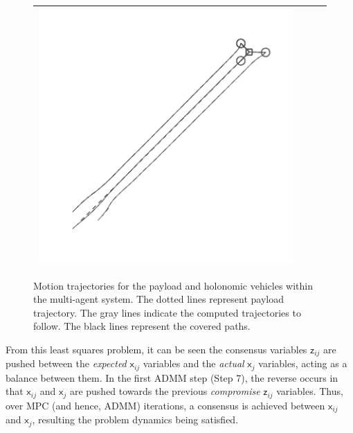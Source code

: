 \documentclass[letterpaper, 10 pt, conference]{ieeeconf}
\newcommand{\cx}{\textsf{x}}
\newcommand{\cz}{\textsf{z}}
\begin{document}
\begin{figure}[t]
\begin{tabular}[t]{|c|c|c|c|}
			\includegraphics[scale=0.6]{figures/holonomic_3_tikz_gray.pdf} \\
		\hline
	\end{tabular}
	\caption{Motion trajectories for the payload and holonomic vehicles within the multi-agent system. The dotted lines represent payload trajectory. The gray lines indicate the computed trajectories to follow. The black lines represent the covered paths.}
	\label{trajectories}
\end{figure}
From this least squares problem, it can be seen the consensus variables $\cz_{ij}$ are pushed between the \textit{expected} $\cx_{ij}$ variables and the \textit{actual} $\cx_j$ variables, acting as a balance between them. In the first ADMM step (Step 7), the reverse occurs in that $\cx_{ij}$ and $\cx_j$ are pushed towards the previous \textit{compromise} $\cz_{ij}$ variables. Thus, over MPC (and hence, ADMM) iterations, a consensus is achieved between $\cx_{ij}$ and $\cx_j$, resulting the problem dynamics being satisfied.
\end{document}

